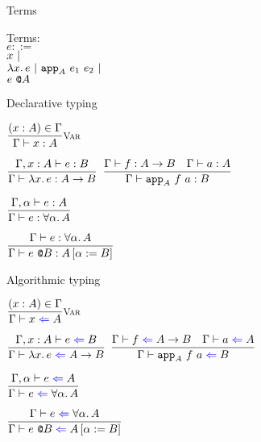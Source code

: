 \documentclass{beamer}
\begin{document}
\begin{frame}{Terms}

Terms: \\
$e ::=$ \\
\qquad $x \pipe $ \\
\qquad $\fun{x}{e} \pipe \iapp{A}{e_1}{e_2} \pipe$ \\
\qquad $\tapp{e}{A}$

\end{frame}

\begin{frame}{Declarative typing}

\begin{center}
  $\infrule[Var]{\sidecond{(x : A) \in \Gamma}}{\typing{x}{A}}$

  \vspace{2em}

  $\infrule{\fulltyping{\extend{\Gamma}{x}{A}}{e}{B}}{\typing{\fun{x}{e}}{\Fun{A}{B}}}$ \quad
  $\infrule{\typing{f}{\Fun{A}{B}} \quad \typing{a}{A}}{\typing{\iapp{A}{f}{a}}{B}}$

  \vspace{2em}

  $\infrule{\fulltyping{\extendtype{\Gamma}{\alpha}}{e}{A}}{\typing{e}{\ForallT{\alpha}{A}}}$

  \vspace{2em}

  $\infrule{\typing{e}{\ForallT{\alpha}{A}}}{\typing{\tapp{e}{B}}{\subst{A}{\alpha}{B}}}$
\end{center}

\end{frame}

\begin{frame}{Algorithmic typing}

\begin{center}
  $\infrule[Var]{\sidecond{(x : A) \in \Gamma}}{\check{x}{A}}$

  \vspace{2em}

  $\infrule{\fullcheck{\extend{\Gamma}{x}{A}}{e}{B}}{\check{\fun{x}{e}}{\Fun{A}{B}}}$ \quad
  $\infrule{\check{f}{\Fun{A}{B}} \quad \check{a}{A}}{\check{\iapp{A}{f}{a}}{B}}$

  \vspace{2em}

  $\infrule{\fullcheck{\extendtype{\Gamma}{\alpha}}{e}{A}}{\check{e}{\ForallT{\alpha}{A}}}$

  \vspace{2em}

  $\infrule{\check{e}{\ForallT{\alpha}{A}}}{\check{\tapp{e}{B}}{\subst{A}{\alpha}{B}}}$
\end{center}

\end{frame}
\end{document}
